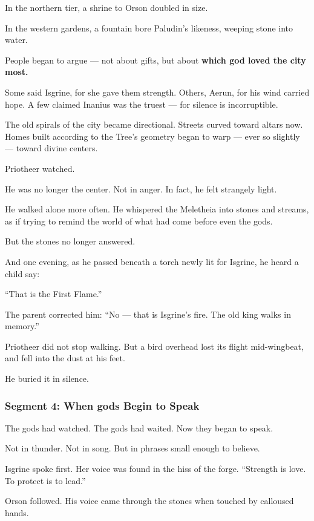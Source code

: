 \documentclass[9pt]{article}
\begin{document}
In the northern tier, a shrine to Orson doubled in size.  

In the western gardens, a fountain bore Paludin’s likeness, weeping stone into water.

People began to argue — not about gifts,  
but about \textbf{which god loved the city most.}

Some said Isgrine, for she gave them strength.  
Others, Aerun, for his wind carried hope.  
A few claimed Inanius was the truest — for silence is incorruptible.

The old spirals of the city became directional.  
Streets curved toward altars now.  
Homes built according to the Tree’s geometry began to warp — ever so slightly — toward divine centers.

Priotheer watched.

He was no longer the center.  
Not in anger.  
In fact, he felt strangely light.

He walked alone more often.  
He whispered the Meletheia into stones and streams,  
as if trying to remind the world of what had come before even the gods.

But the stones no longer answered.

And one evening, as he passed beneath a torch newly lit for Isgrine,  
he heard a child say:

 “That is the First Flame.”

The parent corrected him:  
 “No — that is Isgrine’s fire. The old king walks in memory.”

Priotheer did not stop walking.  
But a bird overhead lost its flight mid-wingbeat,  
and fell into the dust at his feet.

He buried it in silence.

\newpage

\subsubsection*{Segment 4: When gods Begin to Speak}

The gods had watched.  
The gods had waited.  
Now they began to speak.

Not in thunder. Not in song.  
But in phrases small enough to believe.

Isgrine spoke first.  
Her voice was found in the hiss of the forge.  
 “Strength is love. To protect is to lead.”

Orson followed.  
His voice came through the stones when touched by calloused hands. 
\end{document}
